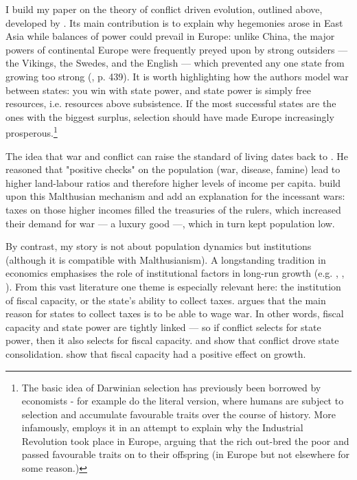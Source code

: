 \documentclass[11pt, a4paper]{article}
\begin{document}
I build my paper on the theory of conflict driven evolution, outlined above, developed by \cite{levine2013, levine2021, levine2022}. Its main contribution is to explain why hegemonies arose in East Asia while balances of power could prevail in Europe: unlike China, the major powers of continental Europe were frequently preyed upon by strong outsiders --- the Vikings, the Swedes, and the English --- which prevented any one state from growing too strong (\citealp{levine2021}, p. 439). It is worth highlighting how the authors model war between states: you win with state power, and state power is simply free resources, i.e. resources above subsistence. If the most successful states are the ones with the biggest surplus, selection should have made Europe increasingly prosperous.\footnote{The basic idea of Darwinian selection has previously been borrowed by economists - for example \cite{galor2002} do the literal version, where humans are subject to selection and accumulate favourable traits over the course of history. More infamously, \cite{clark2007} employs it in an attempt to explain why the Industrial Revolution took place in Europe, arguing that the rich out-bred the poor and passed favourable traits on to their offspring (in Europe but not elsewhere for some reason.)}

The idea that war and conflict can raise the standard of living dates back to \cite{malthus1798}. He reasoned that "positive checks" on the population (war, disease, famine) lead to higher land-labour ratios and therefore higher levels of income per capita. \cite{voigtlnder2013} build upon this Malthusian mechanism and add an explanation for the incessant wars: taxes on those higher incomes filled the treasuries of the rulers, which increased their demand for war --- a luxury good ---, which in turn kept population low. 

By contrast, my story is not about population dynamics but institutions (although it is compatible with Malthusianism). A longstanding tradition in economics emphasises the role of institutional factors in long-run growth (e.g. \cite{north1970}, \cite{delong1993}, \cite{ajr2001}). From this vast literature one theme is especially relevant here: the institution of fiscal capacity, or the state's ability to collect taxes. \cite{tilly1985} argues that the main reason for states to collect taxes is to be able to wage war. In other words, fiscal capacity and state power are tightly linked --- so if conflict selects for state power, then it also selects for fiscal capacity. \cite{gennaioli2015} and \cite{cantoni2023} show that conflict drove state consolidation. \cite{dincecco2012} show that fiscal capacity had a positive effect on growth.
\end{document}
